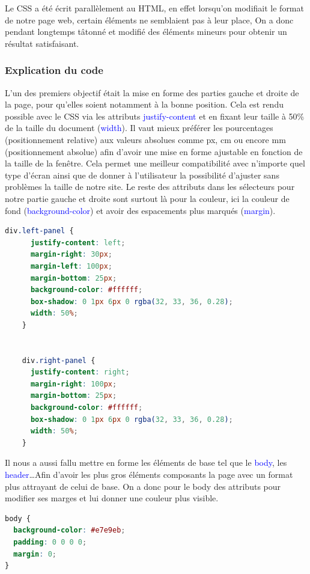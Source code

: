 \documentclass[a4paper]{article}
\renewcommand{\texttt}[2][blue]{\textcolor{#1}{\ttfamily #2}}
\begin{document}
  Le CSS a été écrit parallèlement au HTML, en effet lorsqu'on modifiait le
  format de notre page web, certain éléments ne semblaient pas à leur place, On
  a donc pendant longtemps tâtonné et modifié des éléments mineurs pour obtenir
  un résultat satisfaisant.

  \subsubsection{Explication du code}

  L'un des premiers objectif était la mise en forme des parties gauche et
  droite de la page, pour qu'elles soient notamment à la bonne position. Cela
  est rendu possible avec le CSS via les attributs \texttt{justify-content} et
  en fixant leur taille à 50\% de la taille du document (\texttt{width}). Il
  vaut mieux préférer les pourcentages (positionnement relative) aux valeurs
  absolues comme px, cm ou encore mm (positionnement absolue) afin d'avoir une
  mise en forme ajustable en fonction de la taille de la fenêtre.  Cela permet
  une meilleur compatibilité avec n'importe quel type d'écran ainsi que de
  donner à l'utilisateur la possibilité d'ajuster sans problèmes la taille de
  notre site. Le reste des attributs dans les sélecteurs pour notre partie
  gauche et droite sont surtout là pour la couleur, ici la couleur de fond
  (\texttt{background-color}) et avoir des espacements plus marqués
  (\texttt{margin}).

  \begin{lstlisting}[language=CSS]
    div.left-panel {
      justify-content: left;
      margin-right: 30px;
      margin-left: 100px;
      margin-bottom: 25px;
      background-color: #ffffff;
      box-shadow: 0 1px 6px 0 rgba(32, 33, 36, 0.28);
      width: 50%;
    }


    div.right-panel {
      justify-content: right;
      margin-right: 100px;
      margin-bottom: 25px;
      background-color: #ffffff;
      box-shadow: 0 1px 6px 0 rgba(32, 33, 36, 0.28);
      width: 50%;
    }
  \end{lstlisting}

  Il nous a aussi fallu mettre en forme les éléments de base tel que le
  \texttt{body}, les \texttt{header}\dots Afin d'avoir les plus gros éléments
  composants la page avec un format plus attrayant de celui de base. On a donc
  pour le body des attributs pour modifier ses marges et lui donner une couleur
  plus visible.

\begin{lstlisting}[language=CSS]
  body {
  background-color: #e7e9eb;
  padding: 0 0 0 0;
  margin: 0;
}
\end{lstlisting}
\end{document}
